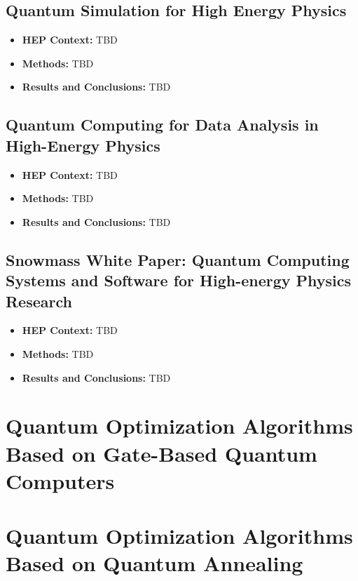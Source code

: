 \subsection{Quantum Simulation for High Energy Physics~\cite{Bauer:2022hpo}}
\begin{itemize}
	\item \textbf{HEP Context: }TBD
	\item \textbf{Methods: }TBD
	\item \textbf{Results and Conclusions: }TBD
\end{itemize}\subsection{Quantum Computing for Data Analysis in High-Energy Physics~\cite{Delgado:2022tpc}}
\begin{itemize}
	\item \textbf{HEP Context: }TBD
	\item \textbf{Methods: }TBD
	\item \textbf{Results and Conclusions: }TBD
\end{itemize}\subsection{Snowmass White Paper: Quantum Computing Systems and Software for High-energy Physics Research~\cite{Humble:2022vtm}}
\begin{itemize}
	\item \textbf{HEP Context: }TBD
	\item \textbf{Methods: }TBD
	\item \textbf{Results and Conclusions: }TBD
\end{itemize}

\section{Quantum Optimization Algorithms Based on Gate-Based Quantum Computers}



\section{Quantum Optimization Algorithms Based on Quantum Annealing}

